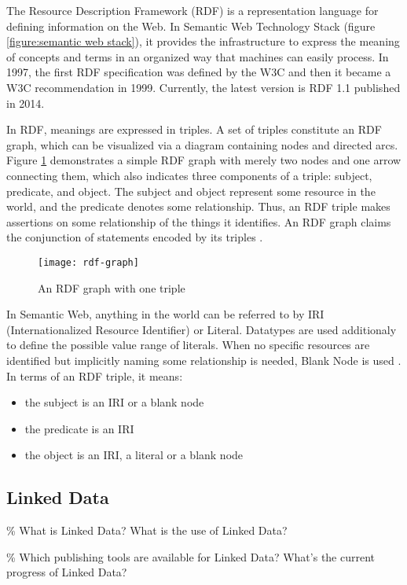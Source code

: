 The Resource Description Framework (RDF) is a representation language for defining information on the Web. In Semantic Web Technology Stack (figure \ref{figure:semantic web stack}), it provides the infrastructure to express the meaning of concepts and terms in an organized way that machines can easily process. In 1997, the first RDF specification was defined by the W3C and then it became a W3C recommendation in 1999. Currently, the latest version is RDF 1.1 \cite{Cyganiak2014} published in 2014.

In RDF, meanings are expressed in triples. A set of triples constitute an RDF graph, which can be visualized via a diagram containing nodes and directed arcs. Figure \ref{figure:rdf example} demonstrates a simple RDF graph with merely two nodes and one arrow connecting them, which also indicates three components of a triple: subject, predicate, and object. The subject and object represent some resource in the world, and the predicate denotes some relationship. Thus, an RDF triple makes assertions on some relationship of the things it identifies. An RDF graph claims the conjunction of statements encoded by its triples \cite{Cyganiak2014}.

\begin{figure}[h]
\texttt{[image: rdf-graph]}
\centering
\caption{An RDF graph with one triple}
\label{figure:rdf example}
\end{figure}

In Semantic Web, anything in the world can be referred to by IRI (Internationalized Resource Identifier) or Literal. Datatypes are used additionaly to define the possible value range of literals. When no specific resources are identified but implicitly naming some relationship is needed, Blank Node is used \cite{Cyganiak2014}. In terms of an RDF triple, it means: 
\medskip
\begin{itemize}
\item the subject is an IRI or a blank node
\item the predicate is an IRI
\item the object is an IRI, a literal or a blank node
\end{itemize}

\subsection{Linked Data} \label{subsection:linked data}
\% What is Linked Data? What is the use of Linked Data? 

\% Which publishing tools are available for Linked Data? What's the current progress of Linked Data?

